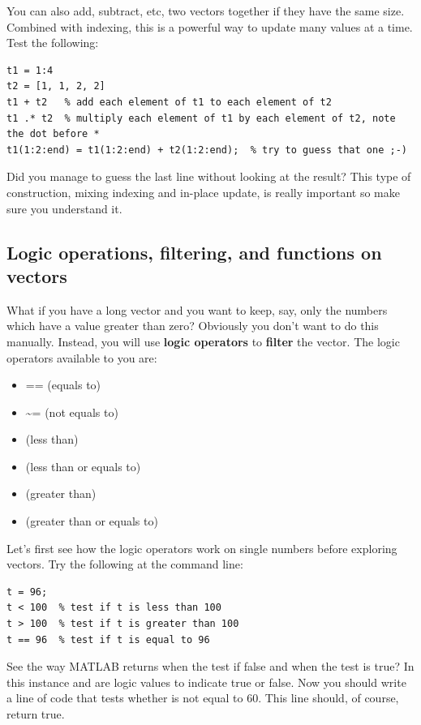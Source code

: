 \documentclass{article}
\begin{document}
You can also add, subtract, etc, two vectors together if they have the same size.
Combined with indexing, this is a powerful way to update many values at a time.
Test the following:
\begin{lstlisting}
t1 = 1:4
t2 = [1, 1, 2, 2]
t1 + t2   % add each element of t1 to each element of t2
t1 .* t2  % multiply each element of t1 by each element of t2, note the dot before *
t1(1:2:end) = t1(1:2:end) + t2(1:2:end);  % try to guess that one ;-)
\end{lstlisting}
Did you manage to guess the last line without looking at the result?
This type of construction, mixing indexing and in-place update, is really important so make sure you understand it.


\subsection{Logic operations, filtering, and functions on vectors}

What if you have a long vector and you want to keep, say, only the numbers which have a value greater than zero?
Obviously you don't want to do this manually.
Instead, you will use \textbf{logic operators} to \textbf{filter} the vector.
The logic operators available to you are:
\begin{itemize}
\item {==} (equals to)
\item {\~{}=} (not equals to)
\item \mcode{<} (less than)
\item \mcode{<=} (less than or equals to)
\item \mcode{>} (greater than)
\item \mcode{>=} (greater than or equals to)
\end{itemize}

Let's first see how the logic operators work on single numbers before exploring vectors.
Try the following at the command line:
\begin{lstlisting}
t = 96;
t < 100  % test if t is less than 100
t > 100  % test if t is greater than 100
t == 96  % test if t is equal to 96
\end{lstlisting}

See the way MATLAB returns  when the test if false and  when the test is true?
In this instance  and  are logic values to indicate true or false.
Now you should write a line of code that tests whether  is not equal to 60.
This line should, of course, return true.
\end{document}
